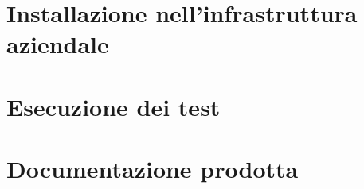 \section{Installazione nell'infrastruttura aziendale}
\label{sec:progettazione-test}

\section{Esecuzione dei test}
\label{sec:esecuzione-test}

\section{Documentazione prodotta}
\label{sec:documentazione}

